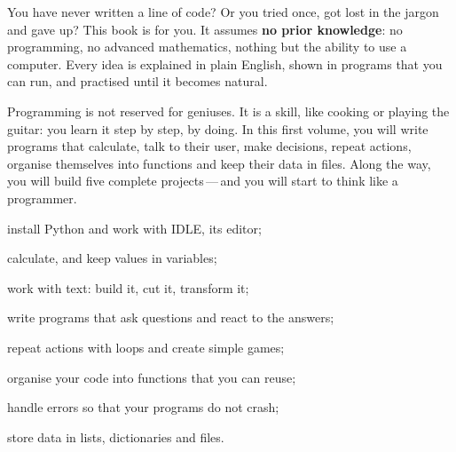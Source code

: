
{\fontsize{11.4}{15.6}\selectfont
You have never written a line of code? Or you tried once, got lost in the jargon and gave up? This
book is for you. It assumes \textbf{no prior knowledge}: no programming, no advanced mathematics,
nothing but the ability to use a computer. Every idea is explained in plain English, shown in
programs that you can run, and practised until it becomes natural.\par\vspace{3mm}

Programming is not reserved for geniuses. It is a skill, like cooking or playing the guitar: you
learn it step by step, by doing. In this first volume, you will write programs that calculate, talk
to their user, make decisions, repeat actions, organise themselves into functions and keep their
data in files. Along the way, you will build five complete projects\,---\,and you will start to
think like a programmer.\par}

\begin{paire}
\begin{tcolorbox}[otBase,colback=otNavyTint,colframe=otNavyTint]
\begin{list}{\otCheck}{\setlength{\leftmargin}{7mm}\setlength{\labelwidth}{4mm}\setlength{\labelsep}{3mm}
  \setlength{\itemsep}{1.6mm}\setlength{\topsep}{0pt}\setlength{\parsep}{0pt}}\fontsize{10.4}{13}\selectfont
\item install Python and work with IDLE, its editor;
\item calculate, and keep values in variables;
\item work with text: build it, cut it, transform it;
\item write programs that ask questions and react to the answers;
\end{list}
\end{tcolorbox}
\begin{tcolorbox}[otBase,colback=otNavyTint,colframe=otNavyTint]
\begin{list}{\otCheck}{\setlength{\leftmargin}{7mm}\setlength{\labelwidth}{4mm}\setlength{\labelsep}{3mm}
  \setlength{\itemsep}{1.6mm}\setlength{\topsep}{0pt}\setlength{\parsep}{0pt}}\fontsize{10.4}{13}\selectfont
\item repeat actions with loops and create simple games;
\item organise your code into functions that you can reuse;
\item handle errors so that your programs do not crash;
\item store data in lists, dictionaries and files.
\end{list}
\end{tcolorbox}
\end{paire}

